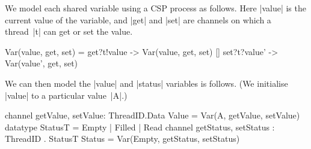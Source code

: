 
We model each shared variable using a CSP process as follows.  Here |value| is
the current value of the variable, and |get| and |set| are channels on which a
thread~|t| can get or set the value.
%
\begin{cspm}
Var(value, get, set) = 
  get?t!value -> Var(value, get, set)
  [] set?t?value' -> Var(value', get, set)
\end{cspm}
%
We can then model the |value| and |status| variables is follows.
(We initialise |value| to a particular value~|A|.)
\begin{cspm}
channel getValue, setValue: ThreadID.Data
Value = Var(A, getValue, setValue) 
datatype StatusT = Empty | Filled | Read
channel getStatus, setStatus : ThreadID . StatusT
Status = Var(Empty, getStatus, setStatus)
\end{cspm}


